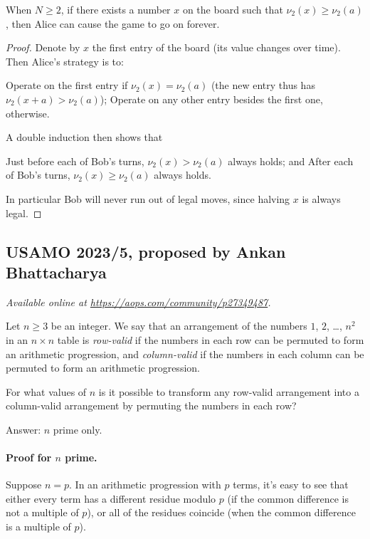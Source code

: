 \documentclass[11pt]{scrartcl}
\begin{document}
\begin{claim*}
  When $N \ge 2$, if there exists a number $x$ on the board such that
  $\nu_2(x) \ge \nu_2(a)$, then Alice can cause the game to go on forever.
\end{claim*}
\begin{proof}
  Denote by $x$ the first entry of the board (its value changes over time).
  Then Alice's strategy is to:
  \begin{itemize}
    \ii Operate on the first entry if $\nu_2(x) = \nu_2(a)$
    (the new entry thus has $\nu_2(x+a) > \nu_2(a)$);
    \ii Operate on any other entry besides the first one, otherwise.
  \end{itemize}
  A double induction then shows that
  \begin{itemize}
    \ii Just before each of Bob's turns, $\nu_2(x) > \nu_2(a)$ always holds; and
    \ii After each of Bob's turns, $\nu_2(x) \ge \nu_2(a)$ always holds.
  \end{itemize}
  In particular Bob will never run out of legal moves,
  since halving $x$ is always legal.
\end{proof}
\pagebreak

\subsection{USAMO 2023/5, proposed by Ankan Bhattacharya}
\textsl{Available online at \url{https://aops.com/community/p27349487}.}
\begin{mdframed}[style=mdpurplebox,frametitle={Problem statement}]
Let $n\geq3$ be an integer. We say that an arrangement of the numbers
$1$, $2$, \dots, $n^2$ in an $n \times n$ table is \emph{row-valid}
if the numbers in each row can be permuted to form an arithmetic progression,
and \emph{column-valid} if the numbers in each column
can be permuted to form an arithmetic progression.

For what values of $n$ is it possible to transform any row-valid arrangement
into a column-valid arrangement by permuting the numbers in each row?
\end{mdframed}
Answer: $n$ prime only.

\paragraph{Proof for $n$ prime.}
Suppose $n = p$.
In an arithmetic progression with $p$ terms, it's easy to see that either
every term has a different residue modulo $p$ (if the common difference
is not a multiple of $p$), or all of the residues coincide
(when the common difference is a multiple of $p$).
\end{document}
